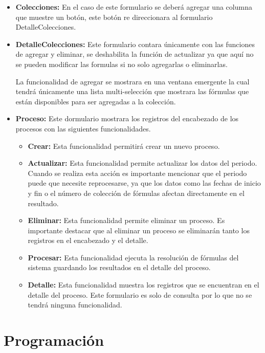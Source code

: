 		\begin{itemize}
			\item \textbf{Colecciones:} En el caso de este formulario se deber\'a agregar una columna que muestre un bot\'on, este bot\'on re direccionara al formulario DetalleColecciones.
			\item \textbf{DetalleColecciones:} Este formulario contara \'unicamente con las funciones de agregar y eliminar, se deshabilita la funci\'on de actualizar ya que aqu\'i no se pueden modificar las formulas si no solo agregarlas o eliminarlas. 

			La funcionalidad de agregar se mostrara en una ventana emergente la cual tendr\'a \'unicamente una lista multi-selecci\'on que mostrara las f\'ormulas que est\'an disponibles para ser agregadas a la colecci\'on.
			\item \textbf{Proceso:} Este dormulario mostrara los registros del encabezado de los procesos con las siguientes funcionalidades.
			\begin{itemize}
				\item \textbf{Crear:} Esta funcionalidad permitir\'a crear un nuevo proceso.
				\item \textbf{Actualizar:} Esta funcionalidad permite actualizar los datos del periodo. Cuando se realiza esta acci\'on es importante mencionar que el periodo puede que necesite reprocesarse, ya que los datos como las fechas de inicio y fin o el n\'umero de colecci\'on de f\'ormulas afectan directamente en el resultado.
				\item \textbf{Eliminar:} Esta funcionalidad permite eliminar un proceso. Es importante destacar que al eliminar un proceso se eliminar\'an tanto los registros en el encabezado y el detalle.
				\item \textbf{Procesar:} Esta funcionalidad ejecuta la resoluci\'on de f\'ormulas del sistema guardando los resultados en el detalle del proceso.
				\item \textbf{Detalle:} Esta funcionalidad muestra los registros que se encuentran en el detalle del proceso. Este formulario es solo de consulta por lo que no se tendr\'a ninguna funcionalidad.
			\end{itemize}
		\end{itemize}



	\section{Programaci\'on}

